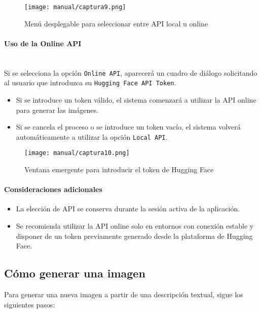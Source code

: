 \begin{figure}[H]
\centering
\texttt{[image: manual/captura9.png]}
\caption{Menú desplegable para seleccionar entre API local u online}
\end{figure}

\paragraph{\textbf{Uso de la Online API}} \mbox{}\\[0.5em]
Si se selecciona la opción \texttt{Online API}, aparecerá un cuadro de diálogo solicitando al usuario que introduzca su \texttt{Hugging Face API Token}.

\begin{itemize}
\item Si se introduce un token válido, el sistema comenzará a utilizar la API online para generar las imágenes.
\item Si se cancela el proceso o se introduce un token vacío, el sistema volverá automáticamente a utilizar la opción \texttt{Local API}.
\end{itemize}

\begin{figure}[H]
\centering
\texttt{[image: manual/captura10.png]}
\caption{Ventana emergente para introducir el token de Hugging Face}
\end{figure}

\paragraph{\textbf{Consideraciones adicionales}}
\begin{itemize}
\item La elección de API se conserva durante la sesión activa de la aplicación.
\item Se recomienda utilizar la API online solo en entornos con conexión estable y disponer de un token previamente generado desde la plataforma de Hugging Face.
\end{itemize}


\subsection{Cómo generar una imagen}
Para generar una nueva imagen a partir de una descripción textual, sigue los siguientes pasos:
 
